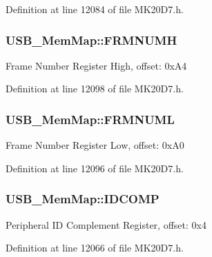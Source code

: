Definition at line 12084 of file M\+K20\+D7.\+h.

\subsubsection[{\texorpdfstring{F\+R\+M\+N\+U\+MH}{FRMNUMH}}]{ U\+S\+B\+\_\+\+Mem\+Map\+::\+F\+R\+M\+N\+U\+MH}\hypertarget{struct_u_s_b___mem_map_a9df319e9feb132fdd9caa55264acfc30}{}\label{struct_u_s_b___mem_map_a9df319e9feb132fdd9caa55264acfc30}
Frame Number Register High, offset\+: 0x\+A4 

Definition at line 12098 of file M\+K20\+D7.\+h.

\subsubsection[{\texorpdfstring{F\+R\+M\+N\+U\+ML}{FRMNUML}}]{ U\+S\+B\+\_\+\+Mem\+Map\+::\+F\+R\+M\+N\+U\+ML}\hypertarget{struct_u_s_b___mem_map_a13d399a89566e622c5de92668f520768}{}\label{struct_u_s_b___mem_map_a13d399a89566e622c5de92668f520768}
Frame Number Register Low, offset\+: 0x\+A0 

Definition at line 12096 of file M\+K20\+D7.\+h.

\subsubsection[{\texorpdfstring{I\+D\+C\+O\+MP}{IDCOMP}}]{ U\+S\+B\+\_\+\+Mem\+Map\+::\+I\+D\+C\+O\+MP}\hypertarget{struct_u_s_b___mem_map_a87d65236c6baf792a723600b0623eca5}{}\label{struct_u_s_b___mem_map_a87d65236c6baf792a723600b0623eca5}
Peripheral ID Complement Register, offset\+: 0x4 

Definition at line 12066 of file M\+K20\+D7.\+h.

